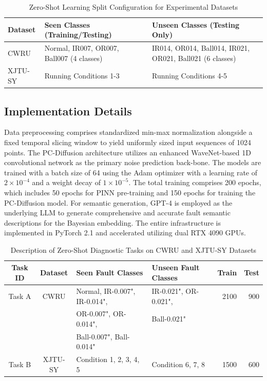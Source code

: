 \documentclass[journal]{IEEEtran}
\begin{document}
\begin{table}[!t]
\centering
\caption{Zero-Shot Learning Split Configuration for Experimental Datasets}
\label{tab:zsl_split}
\begin{tabular}{lll}
\toprule
\textbf{Dataset} & \textbf{Seen Classes (Training/Testing)} & \textbf{Unseen Classes (Testing Only)} \\
\midrule
CWRU & Normal, IR007, OR007, Ball007 (4 classes) & IR014, OR014, Ball014, IR021, OR021, Ball021 (6 classes) \\
XJTU-SY & Running Conditions 1-3 & Running Conditions 4-5 \\
\bottomrule
\end{tabular}
\end{table}

\subsection{Implementation Details}
Data preprocessing comprises standardized min-max normalization alongside a fixed temporal slicing window to yield uniformly sized input sequences of 1024 points. The PC-Diffusion architecture utilizes an enhanced WaveNet-based 1D convolutional network as the primary noise prediction back-bone. The models are trained with a batch size of 64 using the Adam optimizer with a learning rate of $2 \times 10^{-4}$ and a weight decay of $1 \times 10^{-5}$. The total training comprises 200 epochs, which includes 50 epochs for PINN pre-training and 150 epochs for training the PC-Diffusion model. For semantic generation, GPT-4 is employed as the underlying LLM to generate comprehensive and accurate fault semantic descriptions for the Bayesian embedding. The entire infrastructure is implemented in PyTorch 2.1 and accelerated utilizing dual RTX 4090 GPUs.%
\begin{table}[!t]
\centering
\caption{Description of Zero-Shot Diagnostic Tasks on CWRU and XJTU-SY Datasets}
\label{tab:datasets}
\begin{tabular}{ccllrr}
\toprule
\textbf{Task ID} & \textbf{Dataset} & \textbf{Seen Fault Classes} & \textbf{Unseen Fault Classes} & \textbf{Train} & \textbf{Test} \\
\midrule
Task A & CWRU & Normal, IR-0.007", IR-0.014", & IR-0.021", OR-0.021", & 2100 & 900 \\
       &      & OR-0.007", OR-0.014", & Ball-0.021" & & \\
       &      & Ball-0.007", Ball-0.014" & & & \\
\midrule
Task B & XJTU-SY & Condition 1, 2, 3, 4, 5 & Condition 6, 7, 8 & 1500 & 600 \\
\bottomrule
\end{tabular}
\end{table}
\end{document}

